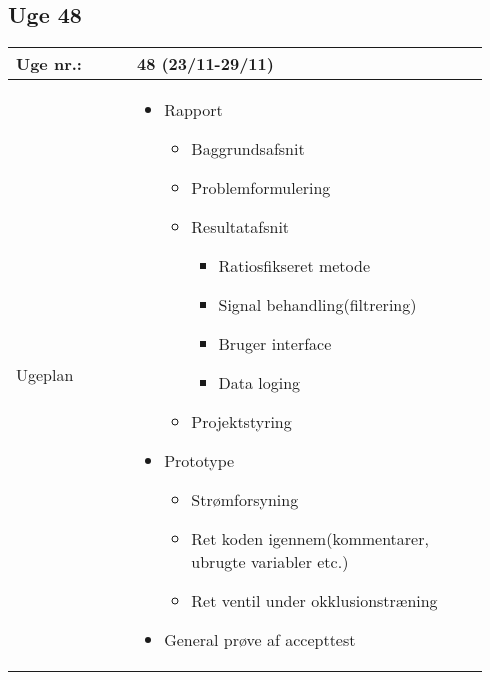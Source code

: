 	\subsection{Uge 48}
	\begin{longtable}{|p{0.24\linewidth}|p{0.7\linewidth}|}
		\hline
		Uge nr.: & 48 (23/11-29/11)\\ \hline
		Ugeplan & 
		\begin{itemize}
			\item Rapport
			\begin{itemize}
				\item Baggrundsafsnit 
				\item Problemformulering
				\item Resultatafsnit
				\begin{itemize}
					\item Ratiosfikseret metode 
					\item Signal behandling(filtrering)
					\item Bruger interface
					\item Data loging 
				\end{itemize}
				\item Projektstyring
			\end{itemize}
			\item Prototype
			\begin{itemize}
				\item Strømforsyning
				\item Ret koden igennem(kommentarer, ubrugte variabler etc.) 
				\item Ret ventil under okklusionstræning
			\end{itemize}
			\item General prøve af accepttest
		\end{itemize}
		

\end{longtable}
